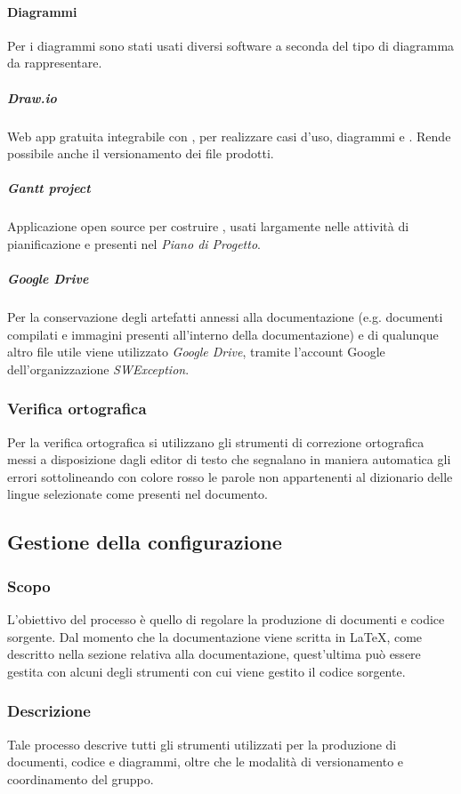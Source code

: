 \paragraph{Diagrammi}
Per i diagrammi sono stati usati diversi software a seconda del tipo di diagramma da rappresentare.
\subparagraph{\textit{Draw.io}}
Web app gratuita integrabile con , per realizzare casi d'uso, diagrammi e . Rende possibile anche il versionamento dei file prodotti.
\subparagraph{\textit{Gantt project}}
Applicazione open source per costruire , usati largamente nelle attività di pianificazione e presenti nel \textit{Piano di Progetto}.
\subparagraph{\textit{Google Drive}}
Per la conservazione degli artefatti annessi alla documentazione (e.g. documenti compilati e immagini presenti all'interno della documentazione) e di qualunque altro file utile viene utilizzato \textit{Google Drive}, tramite l'account Google dell'organizzazione \textit{SWException}. 

\subsubsection{Verifica ortografica}
Per la verifica ortografica si utilizzano gli strumenti di correzione ortografica messi a disposizione dagli editor di testo che segnalano in maniera automatica gli errori sottolineando con colore rosso le parole non appartenenti al dizionario delle lingue selezionate come presenti nel documento.

\subsection{Gestione della configurazione} \label{_gestioneDellaConfigurazione}
\subsubsection{Scopo}
L'obiettivo del processo è quello di regolare la produzione di documenti e codice sorgente.
Dal momento che la documentazione viene scritta in \LaTeX, come descritto nella sezione relativa
alla documentazione, quest'ultima può essere gestita con alcuni degli strumenti con
cui viene gestito il codice sorgente.

\subsubsection{Descrizione}
Tale processo descrive tutti gli strumenti utilizzati per la produzione di documenti, codice e diagrammi,
oltre che le modalità di versionamento e coordinamento del gruppo.

